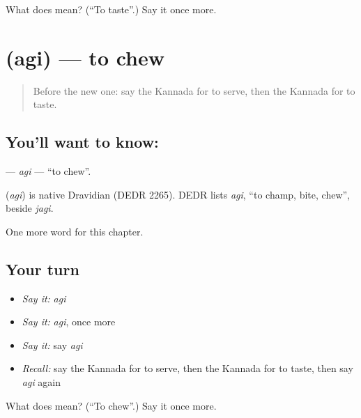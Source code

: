 \begin{tcolorbox}[breakable,colback=teal!4,colframe=teal!35!black,title={Before you move on}]
What does   mean? (\textquotedblleft{}To taste\textquotedblright{}.) Say it once more.
\end{tcolorbox}
\section[\texorpdfstring{\kn{ಅಗಿ} (agi)}{ಅಗಿ (agi)}]{ (agi) — to chew}

\label{lesson:KA-C159-agi}



\begin{quote}
Before the new one: say the Kannada for to serve, then the Kannada for to taste.
\end{quote}

\subsection*{You'll want to know: }
\textbf{} — \emph{agi} — \textquotedblleft{}to chew\textquotedblright{}.

\begin{cousinweb}
\textbf{} (\emph{agi}) is native Dravidian (DEDR 2265). DEDR lists \emph{agi}, \textquotedblleft{}to champ, bite, chew\textquotedblright{}, beside \emph{jagi}.
\end{cousinweb}

\begin{grammarlens}[title={What you've built}]
One more word for this chapter.
\end{grammarlens}

\subsection*{Your turn}
\begin{itemize}
\raggedright
  \item \emph{Say it:} \emph{agi}
  \item \emph{Say it:} \emph{agi}, once more
  \item \emph{Say it:} say \emph{agi}
  \item \emph{Recall:} say the Kannada for to serve, then the Kannada for to taste, then say \emph{agi} again
\end{itemize}

\begin{tcolorbox}[breakable,colback=teal!4,colframe=teal!35!black,title={Before you move on}]
What does  mean? (\textquotedblleft{}To chew\textquotedblright{}.) Say it once more.
\end{tcolorbox}
